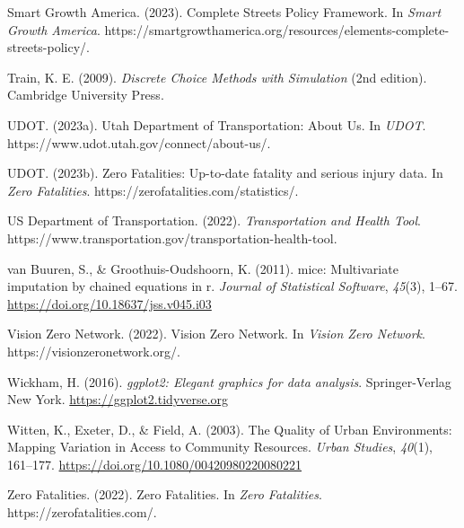 \documentclass[
  letterpaper,
  authoryear,
  review,
  3p]{elsarticle}
\newlength{\cslhangindent}
\newlength{\cslentryspacingunit} %
\newenvironment{CSLReferences}[2] %
 {%
  \setlength{\parindent}{0pt}
  \ifodd #1
  \let\oldpar\par
  \def\par{\hangindent=\cslhangindent\oldpar}
  \fi
  \setlength{\parskip}{#2\cslentryspacingunit}
 }%
 {}
\begin{document}
\begin{CSLReferences}{1}{0}
\leavevmode{}%
Smart Growth America. (2023). Complete {Streets Policy Framework}. In
\emph{Smart Growth America}.
https://smartgrowthamerica.org/resources/elements-complete-streets-policy/.

\leavevmode{}%
Train, K. E. (2009). \emph{Discrete {Choice Methods} with {Simulation}}
(2nd edition). {Cambridge University Press}.

\leavevmode{}%
UDOT. (2023a). Utah {Department} of {Transportation}: {About Us}. In
\emph{UDOT}. https://www.udot.utah.gov/connect/about-us/.

\leavevmode{}%
UDOT. (2023b). Zero {Fatalities}: {Up-to-date} fatality and serious
injury data. In \emph{Zero Fatalities}.
https://zerofatalities.com/statistics/.

\leavevmode{}%
US Department of Transportation. (2022). \emph{Transportation and
{Health Tool}}.
https://www.transportation.gov/transportation-health-tool.

\leavevmode{}%
van Buuren, S., \& Groothuis-Oudshoorn, K. (2011). {mice}: Multivariate
imputation by chained equations in r. \emph{Journal of Statistical
Software}, \emph{45}(3), 1--67.
\url{https://doi.org/10.18637/jss.v045.i03}

\leavevmode{}%
Vision Zero Network. (2022). Vision {Zero Network}. In \emph{Vision Zero
Network}. https://visionzeronetwork.org/.

\leavevmode{}%
Wickham, H. (2016). \emph{ggplot2: Elegant graphics for data analysis}.
Springer-Verlag New York. \url{https://ggplot2.tidyverse.org}

\leavevmode{}%
Witten, K., Exeter, D., \& Field, A. (2003). The {Quality} of {Urban
Environments}: {Mapping Variation} in {Access} to {Community Resources}.
\emph{Urban Studies}, \emph{40}(1), 161--177.
\url{https://doi.org/10.1080/00420980220080221}

\leavevmode{}%
Zero Fatalities. (2022). Zero {Fatalities}. In \emph{Zero Fatalities}.
https://zerofatalities.com/.

\end{CSLReferences}
\end{document}
